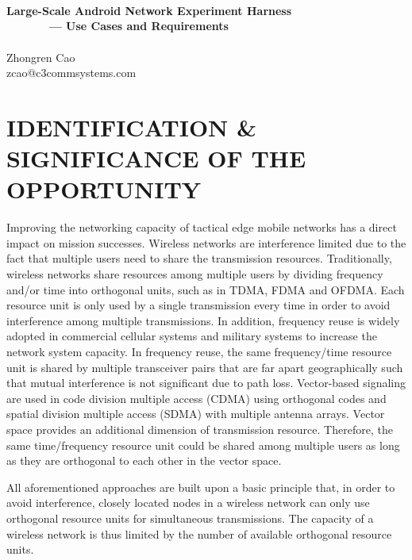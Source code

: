 \documentclass[letterpaper,11pt,onecolumn]{article}
\begin{document}

\thispagestyle{fancy}

\begin{center}
~\\
~\\
~\\
{\Large{\bf{Large-Scale Android Network Experiment Harness\\
~~~~~~ --- Use Cases and Requirements}}}\\
~\\
\vspace{0.1in}
Zhongren Cao\\
zcao@c3commsystems.com
\end{center}

\vspace{0.1in}

\section{IDENTIFICATION \& SIGNIFICANCE OF THE OPPORTUNITY}


Improving the networking capacity of tactical edge mobile networks has a direct impact on mission successes. Wireless networks are interference limited due to the fact that multiple users need to share the transmission resources. Traditionally, wireless networks share resources among multiple users by dividing frequency and/or time into orthogonal units, such as in TDMA, FDMA and OFDMA. Each resource unit is only used by a single transmission every time in order to avoid interference among multiple transmissions. In addition, frequency reuse is widely adopted in commercial cellular systems and military systems to increase the network system capacity. In frequency reuse, the same frequency/time resource unit is shared by multiple transceiver pairs that are far apart geographically such that mutual interference is not significant due to path loss. Vector-based signaling are used in code division multiple access (CDMA) using orthogonal codes and spatial division multiple access (SDMA) with multiple antenna arrays. Vector space provides an additional dimension of transmission resource. Therefore, the same time/frequency resource unit could be shared among multiple users as long as they are orthogonal to each other in the vector space. 

All aforementioned approaches are built upon a basic principle that, in order to avoid interference, closely located nodes in a wireless network can only use orthogonal resource units for simultaneous transmissions. The capacity of a wireless network is thus limited by the number of available orthogonal resource units. 
\end{document}
